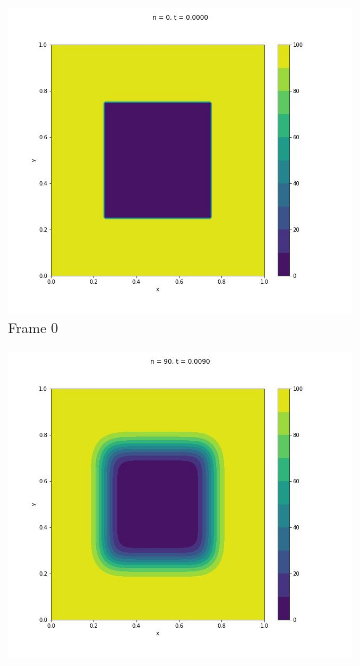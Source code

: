 \documentclass{article}
\begin{document}
\begin{figure} [H]
  \centering
  \begin{subfigure}{0.25\linewidth}
    \centering
    \includegraphics[width=\linewidth]{Cuadrada/2D/0.jpg}
    \caption{Frame 0}
  \end{subfigure}
  \begin{subfigure}{0.25\linewidth}
    \centering
    \includegraphics[width=\linewidth]{Cuadrada/2D/90.jpg}

\end{subfigure}
\end{figure}
\end{document}
